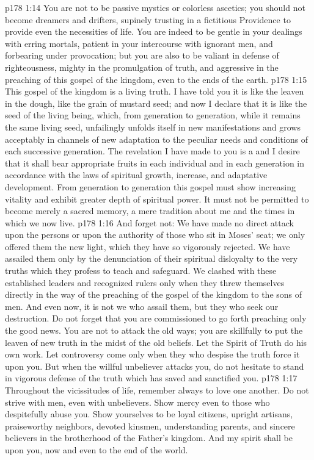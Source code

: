\vs p178 1:14 You are not to be passive mystics or colorless ascetics; you should not become dreamers and drifters, supinely trusting in a fictitious Providence to provide even the necessities of life. You are indeed to be gentle in your dealings with erring mortals, patient in your intercourse with ignorant men, and forbearing under provocation; but you are also to be valiant in defense of righteousness, mighty in the promulgation of truth, and aggressive in the preaching of this gospel of the kingdom, even to the ends of the earth.
\vs p178 1:15 This gospel of the kingdom is a living truth. I have told you it is like the leaven in the dough, like the grain of mustard seed; and now I declare that it is like the seed of the living being, which, from generation to generation, while it remains the same living seed, unfailingly unfolds itself in new manifestations and grows acceptably in channels of new adaptation to the peculiar needs and conditions of each successive generation. The revelation I have made to you is a  and I desire that it shall bear appropriate fruits in each individual and in each generation in accordance with the laws of spiritual growth, increase, and adaptative development. From generation to generation this gospel must show increasing vitality and exhibit greater depth of spiritual power. It must not be permitted to become merely a sacred memory, a mere tradition about me and the times in which we now live.
\vs p178 1:16 And forget not: We have made no direct attack upon the persons or upon the authority of those who sit in Moses’ seat; we only offered them the new light, which they have so vigorously rejected. We have assailed them only by the denunciation of their spiritual disloyalty to the very truths which they profess to teach and safeguard. We clashed with these established leaders and recognized rulers only when they threw themselves directly in the way of the preaching of the gospel of the kingdom to the sons of men. And even now, it is not we who assail them, but they who seek our destruction. Do not forget that you are commissioned to go forth preaching only the good news. You are not to attack the old ways; you are skillfully to put the leaven of new truth in the midst of the old beliefs. Let the Spirit of Truth do his own work. Let controversy come only when they who despise the truth force it upon you. But when the willful unbeliever attacks you, do not hesitate to stand in vigorous defense of the truth which has saved and sanctified you.
\vs p178 1:17 Throughout the vicissitudes of life, remember always to love one another. Do not strive with men, even with unbelievers. Show mercy even to those who despitefully abuse you. Show yourselves to be loyal citizens, upright artisans, praiseworthy neighbors, devoted kinsmen, understanding parents, and sincere believers in the brotherhood of the Father’s kingdom. And my spirit shall be upon you, now and even to the end of the world.
